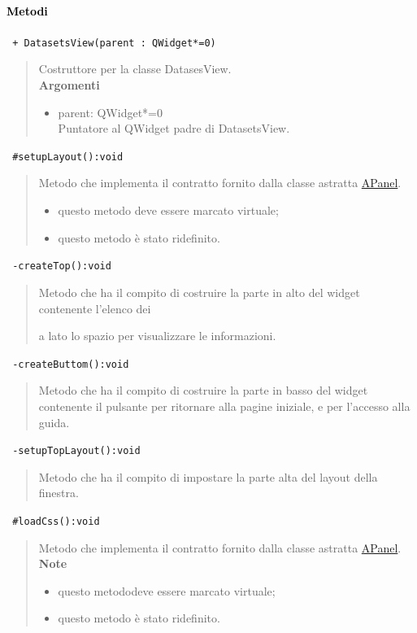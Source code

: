 \paragraph{\textcolor{black}{Metodi\\}}
\color{blue}\verb! + DatasetsView(parent : QWidget*=0)!
\begin{quote}
\color{black}Costruttore per la classe DatasesView. \\
\textbf{Argomenti}
\begin{itemize}
\item parent: QWidget*=0  \\ Puntatore al QWidget padre di DatasetsView.
\end{itemize}
\end{quote}
\color{blue}\verb! #setupLayout():void!
\begin{quote}
\color{black} Metodo che implementa il contratto fornito dalla classe astratta \hyperref[speAPanel]{APanel}.
\begin{itemize}
\item questo metodo deve essere marcato virtuale;
\item questo metodo è stato ridefinito.
\end{itemize}
\end{quote} 
\color{blue}\verb! -createTop():void!
\begin{quote}
\color{black} Metodo che ha il compito di costruire la parte in alto del widget contenente l'elenco dei \subject e a lato lo spazio per visualizzare le informazioni.
\end{quote} 
\color{blue}\verb! -createButtom():void!
\begin{quote}
\color{black} Metodo che ha il compito di costruire la parte in basso del widget contenente il pulsante per ritornare alla pagine iniziale, e per l'accesso alla guida.
\end{quote}
\color{blue}\verb! -setupTopLayout():void!
\begin{quote}
\color{black} Metodo che ha il compito di impostare la parte alta del layout della finestra.
\end{quote}  
\color{blue}\verb! #loadCss():void!
\begin{quote}
\color{black} Metodo che implementa il contratto fornito dalla classe astratta \hyperref[speAPanel]{APanel}.\\
 \textbf{Note}
 \begin{itemize}
  \item questo metododeve essere marcato virtuale;
 \item questo metodo è stato ridefinito.
 \end{itemize}
\end{quote} 
